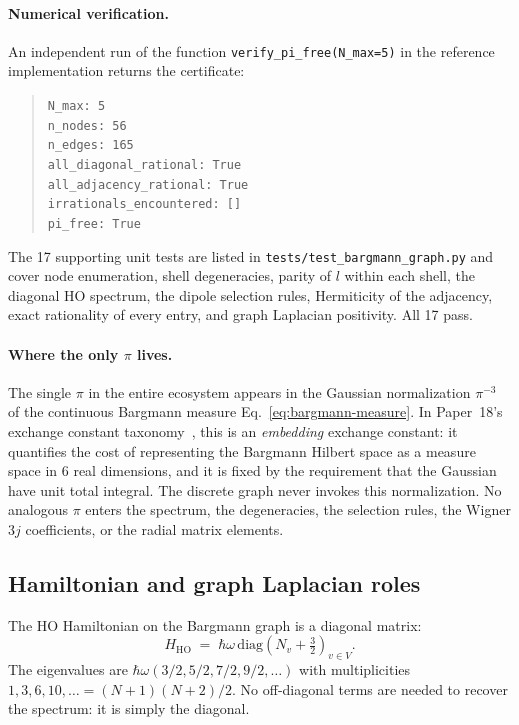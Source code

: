 \documentclass[twocolumn,pra,amsmath,amssymb,superscriptaddress]{revtex4-2}
\begin{document}
\paragraph{Numerical verification.}
An independent run of the function
\texttt{verify\_pi\_free(N\_max=5)} in the reference
implementation returns the certificate:
\begin{quote}\small
\texttt{N\_max: 5}\\
\texttt{n\_nodes: 56}\\
\texttt{n\_edges: 165}\\
\texttt{all\_diagonal\_rational: True}\\
\texttt{all\_adjacency\_rational: True}\\
\texttt{irrationals\_encountered: []}\\
\texttt{pi\_free: True}
\end{quote}
The 17 supporting unit tests are listed in
\texttt{tests/test\_bargmann\_graph.py} and cover node enumeration,
shell degeneracies, parity of $l$ within each shell, the diagonal
HO spectrum, the dipole selection rules, Hermiticity of the
adjacency, exact rationality of every entry, and graph Laplacian
positivity.  All 17 pass.

\paragraph{Where the only $\pi$ lives.}
The single $\pi$ in the entire ecosystem appears in the Gaussian
normalization $\pi^{-3}$ of the continuous Bargmann measure
Eq.~\eqref{eq:bargmann-measure}.  In Paper~18's exchange constant
taxonomy~\cite{paper18}, this is an \emph{embedding} exchange
constant: it quantifies the cost of representing the Bargmann
Hilbert space as a measure space in $6$ real dimensions, and it is
fixed by the requirement that the Gaussian have unit total integral.
The discrete graph never invokes this normalization.  No analogous
$\pi$ enters the spectrum, the degeneracies, the selection rules,
the Wigner $3j$ coefficients, or the radial matrix elements.

\subsection{Hamiltonian and graph Laplacian roles}
\label{sec:roles}

The HO Hamiltonian on the Bargmann graph is a diagonal matrix:
\begin{equation}
  H_{\mathrm{HO}}
  \;=\;
  \hbar\omega \,
  \mathrm{diag}\!\left( N_v + \tfrac{3}{2} \right)_{v \in V}.
  \label{eq:H-graph}
\end{equation}
The eigenvalues are $\hbar\omega(3/2, 5/2, 7/2, 9/2, \ldots)$
with multiplicities $1, 3, 6, 10, \ldots = (N+1)(N+2)/2$.  No
off-diagonal terms are needed to recover the spectrum: it is
simply the diagonal.
\end{document}
